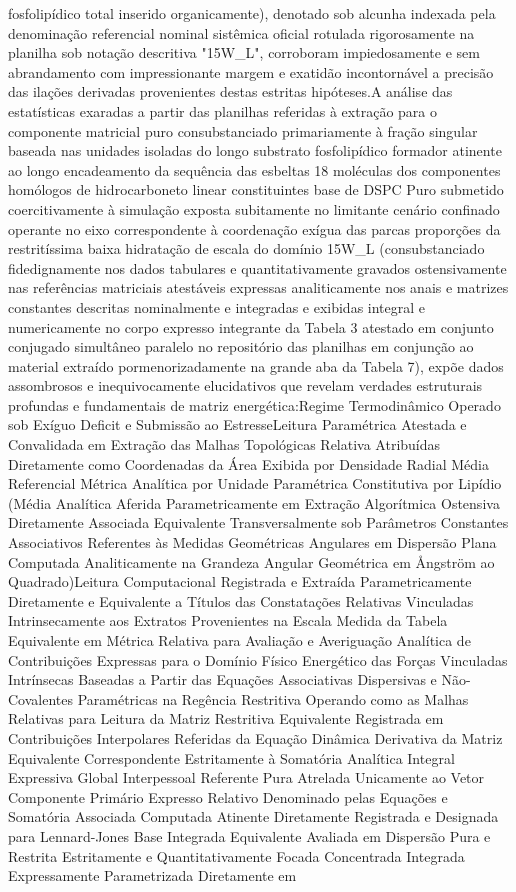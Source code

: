 fosfolipídico total inserido organicamente), denotado sob alcunha indexada pela denominação referencial nominal sistêmica oficial rotulada rigorosamente na planilha sob notação descritiva "15W\_L", corroboram impiedosamente e sem abrandamento com impressionante margem e exatidão incontornável a precisão das ilações derivadas provenientes destas estritas hipóteses.A análise das estatísticas exaradas a partir das planilhas referidas à extração para o componente matricial puro consubstanciado primariamente à fração singular baseada nas unidades isoladas do longo substrato fosfolipídico formador atinente ao longo encadeamento da sequência das esbeltas 18 moléculas dos componentes homólogos de hidrocarboneto linear constituintes base de DSPC Puro submetido coercitivamente à simulação exposta subitamente no limitante cenário confinado operante no eixo correspondente à coordenação exígua das parcas proporções da restritíssima baixa hidratação de escala do domínio 15W\_L (consubstanciado fidedignamente nos dados tabulares e quantitativamente gravados ostensivamente nas referências matriciais atestáveis expressas analiticamente nos anais e matrizes constantes descritas nominalmente e integradas e exibidas integral e numericamente no corpo expresso integrante da Tabela 3 atestado em conjunto conjugado simultâneo paralelo no repositório das planilhas em conjunção ao material extraído pormenorizadamente na grande aba da Tabela 7), expõe dados assombrosos e inequivocamente elucidativos que revelam verdades estruturais profundas e fundamentais de matriz energética:Regime Termodinâmico Operado sob Exíguo Deficit e Submissão ao EstresseLeitura Paramétrica Atestada e Convalidada em Extração das Malhas Topológicas Relativa Atribuídas Diretamente como Coordenadas da Área Exibida por Densidade Radial Média Referencial Métrica Analítica por Unidade Paramétrica Constitutiva por Lipídio (Média Analítica Aferida Parametricamente em Extração Algorítmica Ostensiva Diretamente Associada Equivalente Transversalmente sob Parâmetros Constantes Associativos Referentes às Medidas Geométricas Angulares em Dispersão Plana Computada Analiticamente na Grandeza Angular Geométrica em Ångström ao Quadrado)Leitura Computacional Registrada e Extraída Parametricamente Diretamente e Equivalente a Títulos das Constatações Relativas Vinculadas Intrinsecamente aos Extratos Provenientes na Escala Medida da Tabela Equivalente em Métrica Relativa para Avaliação e Averiguação Analítica de Contribuições Expressas para o Domínio Físico Energético das Forças Vinculadas Intrínsecas Baseadas a Partir das Equações Associativas Dispersivas e Não-Covalentes Paramétricas na Regência Restritiva Operando como as Malhas Relativas para Leitura da Matriz Restritiva Equivalente Registrada em Contribuições Interpolares Referidas da Equação Dinâmica Derivativa da Matriz Equivalente Correspondente Estritamente à Somatória Analítica Integral Expressiva Global Interpessoal Referente Pura Atrelada Unicamente ao Vetor Componente Primário Expresso Relativo Denominado pelas Equações e Somatória Associada Computada Atinente Diretamente Registrada e Designada para Lennard-Jones Base Integrada Equivalente Avaliada em Dispersão Pura e Restrita Estritamente e Quantitativamente Focada Concentrada Integrada Expressamente Parametrizada Diretamente em 